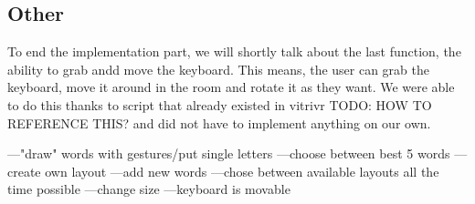 \subsection{Other}
To end the implementation part, we will shortly talk about the last function, the ability to grab andd move the keyboard. This means, the user can grab the keyboard, move it around in the room and rotate it as they want. We were able to do this thanks to script that already existed in vitrivr TODO: HOW TO REFERENCE THIS? and did not have to implement anything on our own.



---"draw" words with gestures/put single letters
---choose between best 5 words
---create own layout
---add new words
---chose between available layouts all the time possible
---change size
---keyboard is movable
